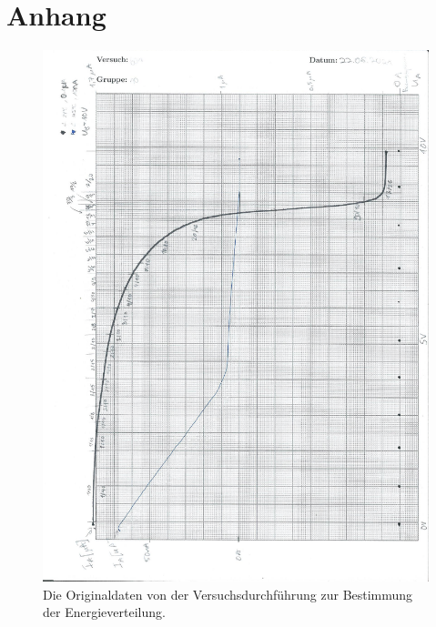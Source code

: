 \section{Anhang}
\label{sec:anhang}

\begin{figure}
    \centering
    \includegraphics[width=\textwidth]{bilder/versuch_teil1.pdf}
    \caption{Die Originaldaten von der Versuchsdurchführung zur Bestimmung der Energieverteilung.}
    \label{fig:originaldaten_teil1}
\end{figure}

